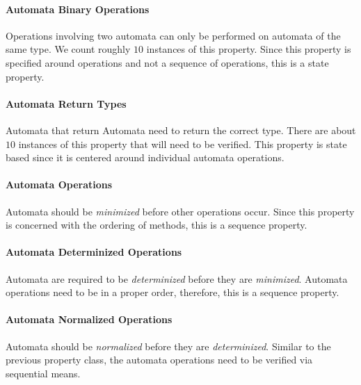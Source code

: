 \documentclass[letterpaper,11pt,twocolumn]{article}
\begin{document}
\paragraph{Automata Binary Operations} Operations involving two automata can
only be performed on automata of the same type.  We count roughly \(10\)
instances of this property.  Since this property is specified around operations
and not a sequence of operations, this is a state property.

\paragraph{Automata Return Types} Automata that return Automata need to
return the correct type.  There are about \(10\) instances of this property
that will need to be verified.  This property is state based since it is
centered around individual automata operations.

\paragraph{Automata Operations} Automata should be \textit{minimized} before
other operations occur.  Since this property is concerned with the ordering of
methods, this is a sequence property.

\paragraph{Automata Determinized Operations} Automata are required to be
\textit{determinized} before they are \textit{minimized}.  Automata operations
need to be in a proper order, therefore, this is a sequence property.

\paragraph{Automata Normalized Operations} Automata should be
\textit{normalized} before they are \textit{determinized}.  Similar to the
previous property class, the automata operations need to be verified via
sequential means.
\end{document}

